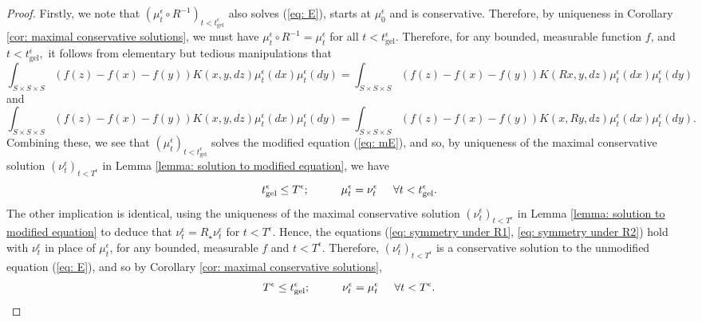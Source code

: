 \begin{proof} Firstly, we note that $( \mu^\epsilon_t \circ R^{-1})_{t<t_\mathrm{gel}^\epsilon}$ also solves (\ref{eq: E}), starts at $\mu^\epsilon_0$ and is conservative. Therefore, by uniqueness in Corollary \ref{cor: maximal conservative solutions}, we must have $\mu^\epsilon_t \circ R^{-1}=\mu^\epsilon_t$ for all $t<t_\mathrm{gel}^\epsilon.$ Therefore, for any bounded, measurable function $f$, and $t<t^\epsilon_\mathrm{gel},$ it follows from elementary but tedious manipulations that \begin{equation}\label{eq: symmetry under R1}
        \int_{S\times S\times S} (f(z)-f(x)-f(y))K(x,y,dz)\mu^\epsilon_t(dx)\mu^\epsilon_t(dy) =  \int_{S\times S\times S} (f(z)-f(x)-f(y))K(Rx,y,dz)\mu^\epsilon_t(dx)\mu^\epsilon_t(dy)
    \end{equation} and
\begin{equation}\label{eq: symmetry under R2}
        \int_{S\times S\times S} (f(z)-f(x)-f(y))K(x,y,dz)\mu^\epsilon_t(dx)\mu^\epsilon_t(dy) =  \int_{S\times S\times S} (f(z)-f(x)-f(y))K(x,Ry,dz)\mu^\epsilon_t(dx)\mu^\epsilon_t(dy).
    \end{equation} Combining these, we see that $(\mu^\epsilon_t)_{t<t^\epsilon_\mathrm{gel}}$ solves the modified equation (\ref{eq: mE}), and so, by uniqueness of the maximal conservative solution $(\nu^\epsilon_t)_{t<T^\epsilon}$ in Lemma \ref{lemma: solution to modified equation}, we have \begin{equation}
        t^\epsilon_\mathrm{gel} \leq T^\epsilon; \hspace{1cm} \mu^\epsilon_t=\nu^\epsilon_t \hspace{0.5cm}\forall t<t^\epsilon_\mathrm{gel}.
    \end{equation} The other implication is identical, using the uniqueness of the maximal conservative solution $(\nu^\epsilon_t)_{t<T^\epsilon}$ in Lemma \ref{lemma: solution to modified equation} to deduce that $\nu^\epsilon_t=R_\star \nu^\epsilon_t$ for $t<T^\epsilon$. Hence, the equations (\ref{eq: symmetry under R1}, \ref{eq: symmetry under R2}) hold with $\nu^\epsilon_t$ in place of $\mu^\epsilon_t$, for any bounded, measurable $f$ and $t<T^\epsilon.$ Therefore, $(\nu^\epsilon_t)_{t<T^\epsilon}$ is a conservative solution to the unmodified equation (\ref{eq: E}), and so by Corollary \ref{cor: maximal conservative solutions}, \begin{equation}
        T^\epsilon \leq t^\epsilon_\mathrm{gel}; \hspace{1cm} \nu^\epsilon_t=\mu^\epsilon_t \hspace{0.5cm}\forall t<T^\epsilon.

\end{equation}
\end{proof}
